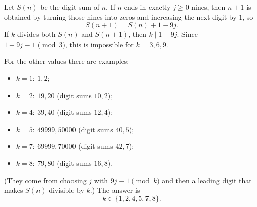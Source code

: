 Let $S(n)$ be the digit sum of $n$. If $n$ ends in exactly $j\ge0$ nines, then $n+1$ is obtained by turning those nines into zeros and increasing the next digit by $1$, so
\[S(n+1)=S(n)+1-9j.\]
If $k$ divides both $S(n)$ and $S(n+1)$, then $k\mid1-9j$. Since $1-9j\equiv1\pmod3$, this is impossible for $k=3,6,9$.

For the other values there are examples:
\begin{itemize}
\item $k=1$: $1,2$;
\item $k=2$: $19,20$ (digit sums $10,2$);
\item $k=4$: $39,40$ (digit sums $12,4$);
\item $k=5$: $49999,50000$ (digit sums $40,5$);
\item $k=7$: $69999,70000$ (digit sums $42,7$);
\item $k=8$: $79,80$ (digit sums $16,8$).
\end{itemize}
(They come from choosing $j$ with $9j\equiv1\pmod k$ and then a leading digit that makes $S(n)$ divisible by $k$.) The answer is
\[\boxed{k\in\{1,2,4,5,7,8\}}.\]
